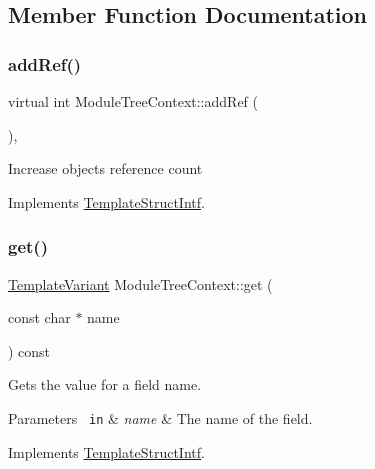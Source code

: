 \subsection{Member Function Documentation}
\mbox{\label{class_module_tree_context_a4aa904edd0388660d04d1b96f6b37aed}} 
\subsubsection{\texorpdfstring{addRef()}{addRef()}}
{\footnotesize\ttfamily virtual int Module\+Tree\+Context\+::add\+Ref (\begin{DoxyParamCaption}{ }\end{DoxyParamCaption})\hspace{0.3cm}{\ttfamily [inline]}, {\ttfamily [virtual]}}

Increase object\textquotesingle{}s reference count 

Implements \mbox{\hyperlink{class_template_struct_intf_a05fe97ad47633beb326f69686faed581}{Template\+Struct\+Intf}}.

\mbox{\label{class_module_tree_context_a9a8cd00410c84008a0ecc795de792ce9}} 
\subsubsection{\texorpdfstring{get()}{get()}}
{\footnotesize\ttfamily \mbox{\hyperlink{class_template_variant}{Template\+Variant}} Module\+Tree\+Context\+::get (\begin{DoxyParamCaption}\item[{const char $\ast$}]{name }\end{DoxyParamCaption}) const\hspace{0.3cm}{\ttfamily [virtual]}}

Gets the value for a field name. 
\begin{DoxyParams}[1]{Parameters}
\mbox{\texttt{ in}}  & {\em name} & The name of the field. \\
\hline
\end{DoxyParams}


Implements \mbox{\hyperlink{class_template_struct_intf_a3d610cb81b4adbb531ebed3aa3d09b51}{Template\+Struct\+Intf}}.

